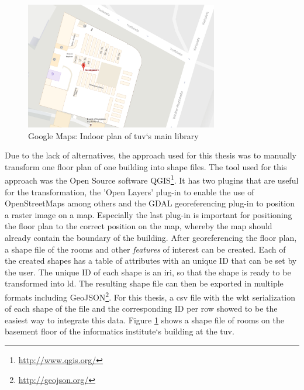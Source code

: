 \documentclass[draft,final]{vutinfth} %
\begin{document}
\begin{figure}[h]
    \centering
    \includegraphics[width=0.75\textwidth]{graphics/google-maps-tu-vienna-library-indoor-plan.png}
    \caption{Google Maps: Indoor plan of \gls{tuv}`s main library}
    \label{fig:solution-data-acquisition:tuvienna-lib-gm-indoor}
\end{figure}

Due to the lack of alternatives, the approach used for this thesis was to manually transform one floor plan of one building into shape files. The tool used for this approach was the Open Source software QGIS\footnote{\url{http://www.qgis.org/}}. It has two plugins that are useful for the transformation, the 'Open Layers' plug-in to enable the use of OpenStreetMaps among others and the GDAL georeferencing plug-in to position a raster image on a map. Especially the last plug-in is important for positioning the floor plan to the correct position on the map, whereby the map should already contain the boundary of the building. After georeferencing the floor plan, a shape file of the rooms and other \textit{features} of interest can be created. Each of the created shapes has a table of attributes with an unique ID that can be set by the user. The unique ID of each shape is an \gls{iri}, so that the shape is ready to be transformed into \gls{ld}. The resulting shape file can then be exported in multiple formats including GeoJSON\footnote{\url{http://geojson.org/}}. For this thesis, a \gls{csv} file with the \gls{wkt} serialization of each shape of the file and the corresponding ID per row showed to be the easiest way to integrate this data. Figure \ref{fig:solution-data-acquisition:tuvienna-lib-gm-indoor} shows a shape file of rooms on the basement floor of the informatics institute`s building at the \gls{tuv}.
\end{document}
